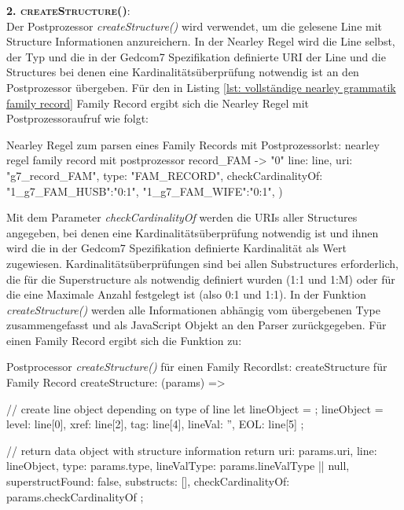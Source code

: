 \textsc{\textbf{2. createStructure()}:} \vspace{0.5em} \\
Der Postprozessor \textit{createStructure()} wird verwendet, um die gelesene Line mit Structure Informationen anzureichern. In der Nearley Regel wird die Line selbst, der Typ und die in der Gedcom7 Spezifikation definierte URI der Line und die Structures bei denen eine Kardinalitätsüberprüfung notwendig ist an den Postprozessor übergeben. Für den in Listing \ref{lst: vollständige nearley grammatik family record} Family Record ergibt sich die Nearley Regel mit Postprozessoraufruf wie folgt:
\vspace{1em}
\begin{javascript}{Nearley Regel zum parsen eines Family Records mit Postprozessor}{lst: nearley regel family record mit postprozessor}
	record_FAM
		-> "0"  %
		 	{%
				line: line,
				uri: "g7_record_FAM", 
				type: "FAM_RECORD", 
				checkCardinalityOf: {
					"1_g7_FAM_HUSB":"0:1", 
					"1_g7_FAM_WIFE":"0:1",
				}
			}) %
\end{javascript}
\vspace{1em}
Mit dem Parameter \textit{checkCardinalityOf} werden die URIs aller Structures angegeben, bei denen eine Kardinalitätsüberprüfung notwendig ist und ihnen wird die in der Gedcom7 Spezifikation definierte Kardinalität als Wert zugewiesen. Kardinalitätsüberprüfungen sind bei allen Substructures erforderlich, die für die Superstructure als notwendig definiert wurden (1:1 und 1:M) oder für die eine Maximale Anzahl festgelegt ist (also 0:1 und 1:1). In der Funktion \textit{createStructure()} werden alle Informationen abhängig vom übergebenen Type zusammengefasst und als JavaScript Objekt an den Parser zurückgegeben. Für einen Family Record ergibt sich die Funktion zu:
\vspace{1em}
\begin{javascript}{Postprocessor \textit{createStructure()} für einen Family Record}{lst: createStructure für Family Record}
	createStructure: (params) => {
		// create line object depending on type of line
		let lineObject = {};
		lineObject = { 
			level: line[0], 
			xref: line[2], 
			tag: line[4], 
			lineVal: '', 
			EOL: line[5] 
		};
		
		// return data object with structure information
		return {
			uri: params.uri,
			line: lineObject,
			type: params.type,
			lineValType: params.lineValType || null,
			superstructFound: false,
			substructs: [],
			checkCardinalityOf: params.checkCardinalityOf
		};
	}
\end{javascript}
\vspace{1em}

